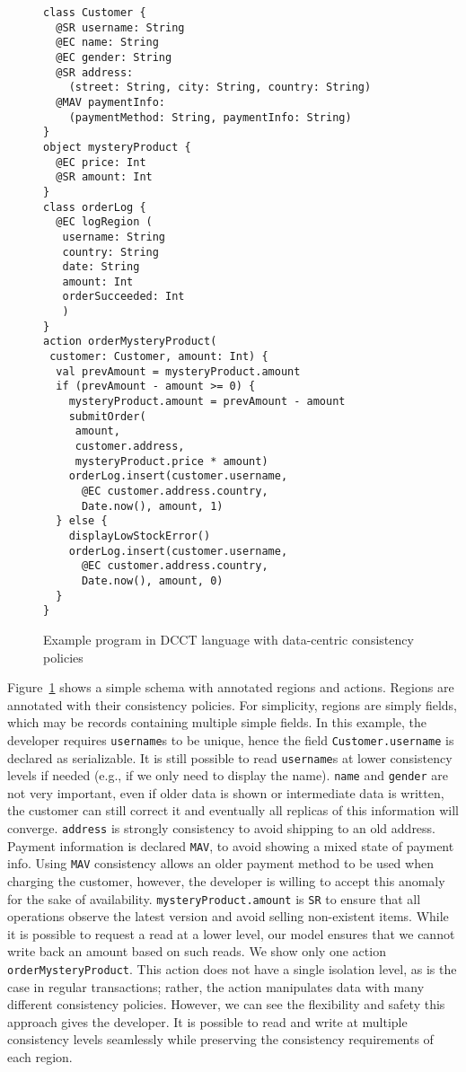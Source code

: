 \documentclass[numbers]{sigplanconf}
\begin{document}
\begin{figure}[t!] 
\begin{lstlisting}[basicstyle=\small\ttfamily]
class Customer {
  @SR username: String
  @EC name: String
  @EC gender: String
  @SR address: 
    (street: String, city: String, country: String) 
  @MAV paymentInfo:
    (paymentMethod: String, paymentInfo: String)
}
object mysteryProduct {
  @EC price: Int
  @SR amount: Int
}
class orderLog {
  @EC logRegion (
   username: String
   country: String
   date: String
   amount: Int
   orderSucceeded: Int 
   )
}
action orderMysteryProduct(
 customer: Customer, amount: Int) {
  val prevAmount = mysteryProduct.amount
  if (prevAmount - amount >= 0) {
    mysteryProduct.amount = prevAmount - amount
    submitOrder(
     amount, 
     customer.address, 
     mysteryProduct.price * amount)
    orderLog.insert(customer.username, 
      @EC customer.address.country, 
      Date.now(), amount, 1)
  } else {
    displayLowStockError() 
    orderLog.insert(customer.username, 
      @EC customer.address.country, 
      Date.now(), amount, 0)
  }
}
\end{lstlisting}
\caption{Example program in DCCT language with data-centric consistency policies}
\label{fig:example}
\end{figure}

Figure~\ref{fig:example} shows a simple schema with annotated
regions and actions. Regions are annotated 
with their consistency policies. For simplicity, regions are simply fields,
which may be records containing multiple simple fields.
%
In this example, the developer requires \texttt{username}s to be 
unique, hence the field \texttt{Customer.username} is declared as serializable.
It is still possible to read \texttt{username}s at lower
consistency levels if needed (e.g., if we only need to display the name). 
\texttt{name} and \texttt{gender} are not very important, even if older
data is shown or intermediate data is written, the customer can still correct
it and eventually all replicas of this information will converge.
\texttt{address} is strongly consistency to avoid shipping to an old address.
Payment information is declared \texttt{MAV}, to avoid showing a mixed state
of payment info. Using \texttt{MAV} consistency
allows an older payment method to be used when charging the customer,
however, the developer is willing to accept this anomaly for the sake of
availability. \texttt{mysteryProduct.amount} is \texttt{SR} to ensure that all operations
observe the latest version and avoid selling non-existent items. While it is possible to 
request a read at a lower level, our model ensures that we cannot write back an amount 
based on such reads.
%
We show only one action \texttt{orderMysteryProduct}. This action does
not have a single isolation level, as is the case in regular transactions;
rather, the action manipulates data with many different consistency policies.
However, we can see the flexibility and safety this approach gives the
developer. It is possible to read and write at multiple consistency levels
seamlessly while preserving the consistency requirements of each region.
\end{document}
